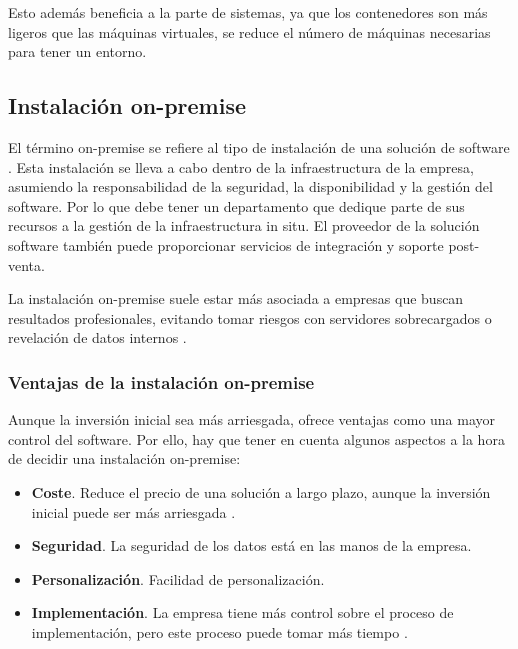 Esto además beneficia a la parte de sistemas, ya que los contenedores son más ligeros que las máquinas virtuales, se reduce el número de máquinas necesarias para tener un entorno.

\subsection{Instalación on-premise}

El término on-premise se refiere al tipo de instalación de una solución de software \cite{premise4}. Esta instalación se lleva a cabo dentro de la infraestructura de la empresa, asumiendo la responsabilidad de la seguridad, la disponibilidad y la gestión del software. Por lo que debe tener un departamento que dedique parte de sus recursos a la gestión de la infraestructura in situ. El proveedor de la solución software también puede proporcionar servicios de integración y soporte post-venta.

La instalación on-premise suele estar más asociada a empresas que buscan resultados profesionales, evitando tomar riesgos con servidores sobrecargados o revelación de datos internos \cite{premise1}.

\subsubsection{Ventajas de la instalación on-premise}

Aunque la inversión inicial sea más arriesgada, ofrece ventajas como una mayor control del software. Por ello, hay que tener en cuenta algunos aspectos a la hora de decidir una instalación on-premise:

\begin{itemize}
  \item \textbf{Coste}. Reduce el precio de una solución a largo plazo, aunque la inversión inicial puede ser más arriesgada \cite{premise4}.
  \item \textbf{Seguridad}. La seguridad de los datos está en las manos de la empresa.
  \item \textbf{Personalización}. Facilidad de personalización.
  \item \textbf{Implementación}. La empresa tiene más control sobre el proceso de implementación, pero este proceso puede tomar más tiempo \cite{premise4}.
\end{itemize}
